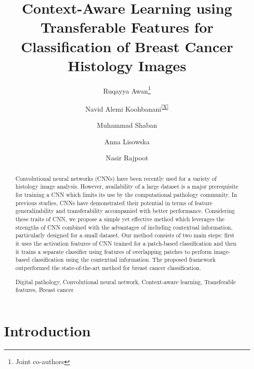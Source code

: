 \documentclass[runningheads,a4paper]{llncs}
\newcommand{\repthanks}[1]{\textsuperscript{\ref{#1}}}
\newcommand{\keywords}[1]{\par\addvspace\baselineskip
\noindent\keywordname\enspace\ignorespaces#1}
\begin{document}
\mainmatter  %

\title{Context-Aware Learning using Transferable Features for Classification of Breast Cancer Histology Images}

\author[1]{Ruqayya Awan\thanks{Joint co-authors\protect\label{X}}}
\author[1,2]{Navid Alemi Koohbanani\repthanks{X}}
\author[1]{Muhammad Shaban}
\author[1]{Anna Lisowska}
\author[1,2,3]{Nasir Rajpoot}



\institute{}




\maketitle


\begin{abstract}
Convolutional neural networks (CNNs) have been recently used for a variety of histology image analysis. However, availability of a large dataset is a major prerequisite for training a CNN which limits its use by the computational pathology community. In previous studies, CNNs have demonstrated their potential in terms of feature generalizability and transferability accompanied with better performance. Considering these traits of CNN, we propose a simple yet effective method which leverages the strengths of CNN combined with the advantages of including contextual information, particularly designed for a small dataset. Our method consists of two main steps: first it uses the activation features of CNN trained for a patch-based classification and then it trains a separate classifier using features of overlapping patches to perform image-based classification using the contextual information. The proposed framework outperformed the state-of-the-art method for breast cancer classification.

\keywords{Digital pathology, Convolutional neural network, Context-aware learning, Transferable features, Breast cancer}
\end{abstract}


\section{Introduction}
\end{document}
